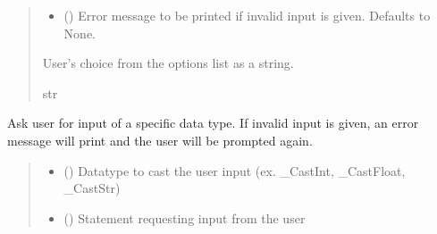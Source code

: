\documentclass[letterpaper,10pt,english]{sphinxmanual}
\begin{document}
\begin{fulllineitems}
\begin{fulllineitems}
\begin{quote}
\begin{description}
\begin{itemize}
\item {} 
\sphinxAtStartPar
{} (\sphinxstyleliteralemphasis{\sphinxupquote{ | }}\sphinxstyleliteralemphasis{\sphinxupquote{, }}) \textendash{} Error message to be printed if invalid input is given.                 Defaults to None.

\end{itemize}

\sphinxAtStartPar
User’s choice from the options list as a string.

\sphinxAtStartPar
str

\end{description}\end{quote}

\end{fulllineitems}


\begin{fulllineitems}
\label{\detokenize{GetUserInput:GetUserInput.UserInput.AskForType}}
\pysigstartsignatures
{}
\pysigstopsignatures
\sphinxAtStartPar
Ask user for input of a specific data type. If invalid input is given, an error message will         print and the user will be prompted again.
\begin{quote}\begin{description}
\begin{itemize}
\item {} 
\sphinxAtStartPar
{} () \textendash{} Datatype to cast the user input (ex. \_CastInt, \_CastFloat, \_CastStr)

\item {} 
\sphinxAtStartPar
{} () \textendash{} Statement requesting input from the user


\end{itemize}
\end{description}
\end{quote}
\end{fulllineitems}
\end{fulllineitems}
\end{document}

